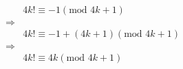 \documentclass[11pt,a4paper]{article}
\author{Anoynmous}
\begin{document}
\begin{align*}
	& 4k! \equiv -1 (\text{mod } 4k+1) \\
	\Rightarrow \\
	& 4k! \equiv -1 + (4k +1) (\text{mod } 4k + 1) \\
	\Rightarrow \\
	& 4k! \equiv 4k (\text{mod } 4k + 1)	
\end{align*}
\end{document}
